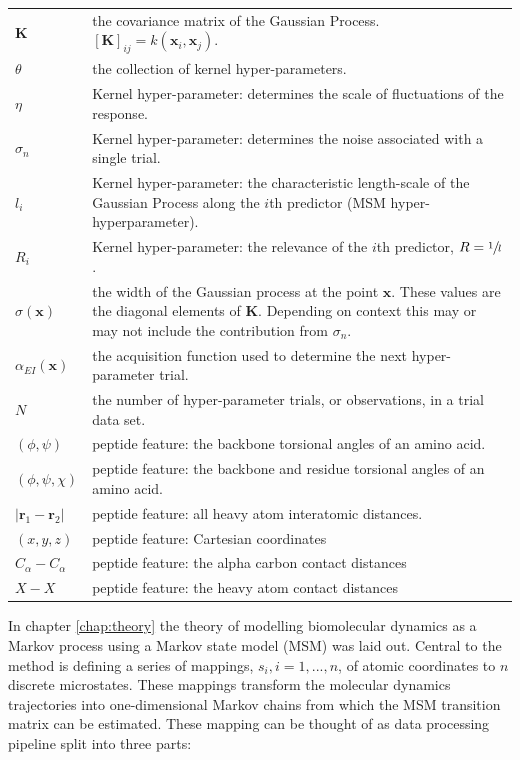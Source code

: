 \begin{table}
\begin{tabularx}{0.9\textwidth}{ |l| >{\raggedright\arraybackslash}X | }
        $\mathbf{K}$ & the covariance matrix of the Gaussian Process. $[\mathbf{K}]_{ij} =k(\mathbf{x}_{i}, \mathbf{x}_{j})$. \\
        $\theta$ & the collection of kernel hyper-parameters. \\
        $\eta$ & Kernel hyper-parameter: determines the scale of fluctuations of the response. \\
        $\sigma_{n}$ & Kernel hyper-parameter: determines the noise associated with a single trial. \\
        $l_{i}$ & Kernel hyper-parameter: the characteristic length-scale of the Gaussian Process 
                along the $i$th predictor (MSM hyper-hyperparameter).\\
        $R_{i}$ & Kernel hyper-parameter: the relevance of the $i$th predictor, $R=\sfrac{1}{l}$. \\ 
        $\sigma(\mathbf{x})$ & the width of the Gaussian process at the point $\mathbf{x}$. These values  are the diagonal elements of $\mathbf{K}$. Depending on context this may or may not include the contribution from $\sigma_{n}$. \\
        $\alpha_{EI}(\mathbf{x})$ & the acquisition function used to determine the next hyper-parameter trial. \\
        $N$ & the number of hyper-parameter trials, or observations,  in a trial data set.\\
        $(\phi, \psi)$ & peptide feature: the backbone torsional angles of an amino acid.  \\
        $(\phi, \psi, \chi)$ & peptide feature: the backbone and residue torsional angles of an amino acid. \\
        $|\mathbf{r}_{1}-\mathbf{r}_{2}|$ & peptide feature: all heavy atom interatomic distances.  \\
        $(x, y, z)$ & peptide feature: Cartesian coordinates \\
        $C_{\alpha}-C_{\alpha}$ & peptide feature: the alpha carbon contact distances \\
        $X-X$ & peptide feature: the heavy atom contact distances \\
     \hline
     \end{tabularx}
    \label{tab:msm_symbols}
\end{table}

In chapter \ref{chap:theory} the theory of modelling biomolecular dynamics as a Markov process using a Markov state model (MSM) was laid out. Central to the method is defining  a series of mappings, $s_i, i=1, ..., n$, of atomic coordinates to $n$ discrete microstates. These mappings transform the molecular dynamics trajectories into one-dimensional Markov chains from which the MSM transition matrix can be estimated. These mapping can be thought of as data processing pipeline split into three parts: 

